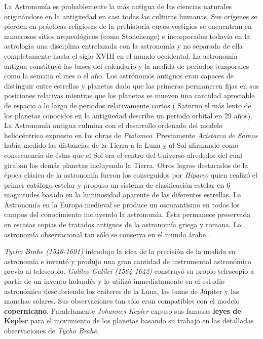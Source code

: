 \bigskip
 La Astronomía es probablemente la más antigua de las ciencias naturales originándose en la antigüedad en casi todas las culturas humanas. Sus orígenes se pierden en prácticas religiosas de la prehistoria cuyos vestigios se encuentran en numerosos sitios arqueológicos (como Stonehenge) e incorporados todavía en la astrología una disciplina entrelazada con la astronomía y no separada de ella completamente hasta el siglo XVIII en el mundo occidental. La astronomía antigua constituyó las bases del calendario y la medida de periodos temporales como la semana el mes o el año. Los astrónomos antiguos eran capaces de distinguir entre estrellas y planetas dado que las primeras permanecen fijas en sus posiciones relativas mientras que los planetas se mueven una cantidad apreciable de espacio a lo largo de periodos relativamente cortos ( Saturno el más lento de los planetas conocidos en la antigüedad describe un periodo orbital en 29 años). La Astronomía antigua culmina con el desarrollo ordenado del modelo heliocéntrico expuesto en las obras de \textit{Ptolomeo}. Previamente \textit{Aristarco de Samos} había medido las distancias de la Tierra a la Luna y al Sol afirmando como consecuencia de éstas que el Sol era el centro del Universo alrededor del cual giraban los demás planetas incluyendo la Tierra. Otros logros destacados de la época clásica de la astronomía fueron los conseguidos por \textit{Hiparco} quien realizó el primer catálogo estelar y propuso un sistema de clasificación estelar en 6 magnitudes basado en la luminosidad aparente de las diferentes estrellas. La Astronomía en la Europa medieval se produce un oscurantismo en todos los campos del conocimiento incluyendo la astronomía. Ésta permanece preservada en escasas copias de tratados antiguos de la astronomía griega y romana. La astronomía observacional tan sólo se conserva en el mundo árabe \cite{LHDLA}.

 \bigskip
 \textit{Tycho Brahe (1546-1601)} introdujo la idea de la precisión de la medida en astronomía e inventó y produjo una gran cantidad de instrumental astronómico previo al telescopio. \textit{Galileo Galilei (1564-1642)} construyó su propio telescopio a partir de un invento holandés y lo utilizó inmediatamente en el estudio astronómico descubriendo los cráteres de la Luna, las lunas de Júpiter y las manchas solares. Sus observaciones tan sólo eran compatibles con el modelo \textbf{copernicano}. Paralelamente \textit{Johannes Kepler} expuso sus famosas \textbf{leyes de Kepler} para el movimiento de los planetas basando su trabajo en las detalladas observaciones de \textit{Tycho Brahe}.

